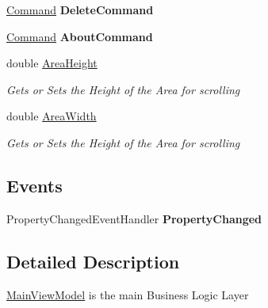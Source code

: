 \begin{DoxyCompactItemize}
\item 
\hypertarget{class_prototipo_t_f_g_1_1_main_view_model_a211616f70aac98c031008658381a6808}{}\hyperlink{class_prototipo_t_f_g_1_1_command}{Command} {\bfseries Delete\+Command}\label{class_prototipo_t_f_g_1_1_main_view_model_a211616f70aac98c031008658381a6808}

\item 
\hypertarget{class_prototipo_t_f_g_1_1_main_view_model_a64ee781eb2b29595586226c5af23a28e}{}\hyperlink{class_prototipo_t_f_g_1_1_command}{Command} {\bfseries About\+Command}\label{class_prototipo_t_f_g_1_1_main_view_model_a64ee781eb2b29595586226c5af23a28e}

\item 
double \hyperlink{class_prototipo_t_f_g_1_1_main_view_model_a0668d75bbef450ad264cedb36afa3f0a}{Area\+Height}
\begin{DoxyCompactList}\small\item\em Gets or Sets the Height of the Area for scrolling \end{DoxyCompactList}\item 
double \hyperlink{class_prototipo_t_f_g_1_1_main_view_model_a3f34ea0e7a598c5a5a3c8a3b180e3900}{Area\+Width}
\begin{DoxyCompactList}\small\item\em Gets or Sets the Height of the Area for scrolling \end{DoxyCompactList}\end{DoxyCompactItemize}
\subsection*{Events}
\begin{DoxyCompactItemize}
\item 
\hypertarget{class_prototipo_t_f_g_1_1_main_view_model_a01f8767a4f27b21dafa1e0233b94f14b}{}Property\+Changed\+Event\+Handler {\bfseries Property\+Changed}\label{class_prototipo_t_f_g_1_1_main_view_model_a01f8767a4f27b21dafa1e0233b94f14b}

\end{DoxyCompactItemize}


\subsection{Detailed Description}
\hyperlink{class_prototipo_t_f_g_1_1_main_view_model}{Main\+View\+Model} is the main Business Logic Layer 



